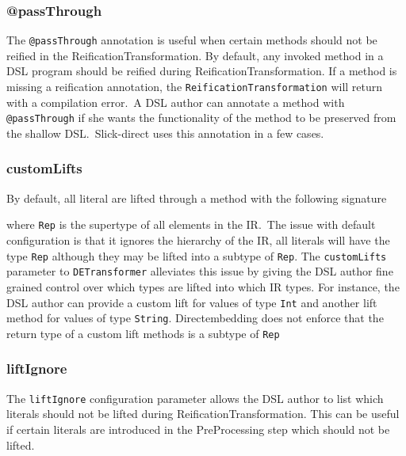 \subsubsection{@passThrough} %
\label{sub:passThrough}
The \texttt{@passThrough} annotation is useful when certain methods should not be reified in the ReificationTransformation.
By default, any invoked method in a DSL program should be reified during ReificationTransformation.
If a method is missing a reification annotation, the \texttt{ReificationTransformation} will return with a compilation error.\
A DSL author can annotate a method with \texttt{@passThrough} if she wants the functionality of the method to be preserved from the shallow DSL.\
Slick-direct uses this annotation in a few cases.

\subsubsection{customLifts} %
\label{sub:customLifts}
By default, all literal are lifted through a method with the following signature

where \texttt{Rep} is the supertype of all elements in the IR.\
The issue with default configuration is that it ignores the hierarchy of the IR, all literals will have the type \texttt{Rep} although they may be lifted into a subtype of \texttt{Rep}.
The \texttt{customLifts} parameter to \texttt{DETransformer} alleviates this issue by giving the DSL author fine grained control over which types are lifted into which IR types.
For instance, the DSL author can provide a custom lift for values of type \texttt{Int} and another lift method for values of type \texttt{String}.
Directembedding does not enforce that the return type of a custom lift methods is a subtype of \texttt{Rep}

\subsubsection{liftIgnore} %
\label{sub:liftIgnore}
The \texttt{liftIgnore} configuration parameter allows the DSL author to list which literals should not be lifted during ReificationTransformation.
This can be useful if certain literals are introduced in the PreProcessing step which should not be lifted.



